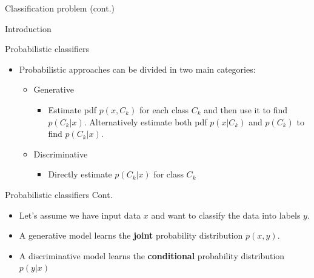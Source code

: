 \documentclass[serif, aspectratio=169]{beamer}
\begin{document}
\begin{frame}{Classification problem (cont.)}
\begin{itemize}
\begin{frame}{Introduction}
\begin{itemize}
\begin{frame}{Probabilistic classifiers}
    \begin{itemize}
        \item Probabilistic approaches can be divided in two main categories:
            \begin{itemize}
                \item Generative
                    \begin{itemize}
                        \item Estimate pdf $p(x, C_k)$ for each class $C_k$ and then use it to find $p(C_k|x)$. Alternatively estimate both pdf $p(x|C_k)$ and $p(C_k)$ to find $p(C_k|x)$.
                    \end{itemize}
                \item Discriminative
                    \begin{itemize}
                        \item Directly estimate $p(C_k|x)$ for class $C_k$
                    \end{itemize}
            \end{itemize}
    \end{itemize}
\end{frame}
\begin{frame}{Probabilistic classifiers Cont.}
    \begin{itemize}
        \item Let's assume we have input data $x$ and want to classify the data into labels $y$.
        \item A generative model learns the \textbf{joint} probability distribution $p(x,y)$.
            
        \item A discriminative model learns the \textbf{conditional} probability distribution $p(y|x)$
           
    \end{itemize}
\end{frame}


\end{itemize}
\end{frame}
\end{itemize}
\end{frame}
\end{document}
